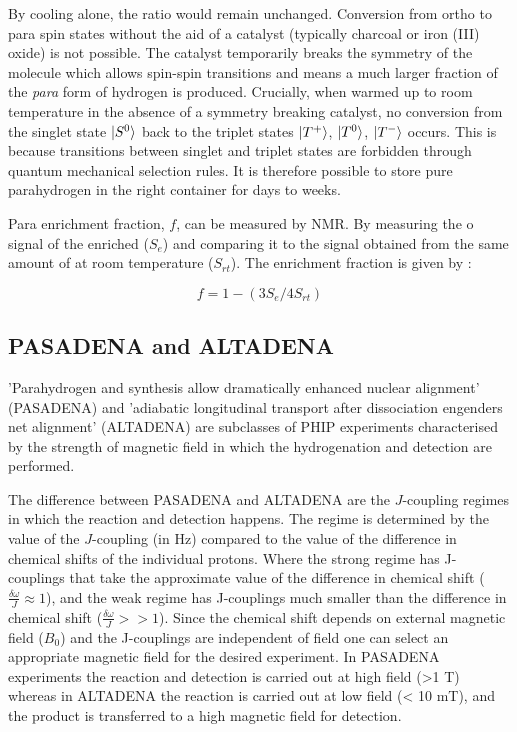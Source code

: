  By cooling alone, the ratio would remain unchanged. Conversion
 from ortho to para spin states without the aid of a catalyst (typically charcoal or iron (III) oxide) is not possible.
 The catalyst temporarily breaks the symmetry of the  molecule which allows spin-spin transitions and means
 a much larger fraction of the \textit{para} form of hydrogen is produced. Crucially, when warmed up to
 room temperature in the absence of a symmetry breaking catalyst, no conversion from the singlet state $\ket{S^0}$ back to
 the triplet states $\ket{T^+}$, $\ket{T^0}$, $\ket{T^-}$ occurs. This is because transitions between singlet and triplet states
 are forbidden through quantum mechanical selection rules. It is therefore possible to store pure parahydrogen
 in the right container for days to weeks.

 Para enrichment fraction, $f$, can be measured by NMR. By measuring the o signal of the enriched  ($S_{e}$)
 and comparing it to the signal obtained from the same amount of  at room temperature ($S_{rt}$).
 The enrichment fraction is given by \citep{RN131, RN132}:

 \begin{equation}\label{pfrac}
   f = 1 -(3S_{e}/4S_{rt})
 \end{equation}

 \subsection{PASADENA and ALTADENA}\label{PASADENA and ALTADENA}

 'Parahydrogen and synthesis allow dramatically enhanced nuclear alignment' (PASADENA)\citep{RN129} and 'adiabatic longitudinal
 transport after dissociation engenders net alignment' (ALTADENA)\citep{RN128}
 are subclasses of PHIP experiments characterised by the strength of magnetic
 field in which the hydrogenation and detection are performed.

 The difference between PASADENA and ALTADENA are the $J$-coupling regimes in which the reaction and detection happens.
 The regime is determined by the value of the $J$-coupling (in Hz) compared to the value of the difference in chemical
 shifts of the individual protons. Where the strong regime has J-couplings that take the approximate value of the difference in chemical shift
 ($\frac{\delta{\omega}}{J}\approx1$), and the weak regime has J-couplings much smaller than the difference in chemical
 shift ($\frac{\delta{\omega}}{J}>>1$). Since the chemical shift depends on external magnetic field ($B_{0}$) and the
 J-couplings are independent of field one can select an appropriate magnetic field for the desired experiment.
 In PASADENA experiments the reaction and detection is carried out at high field (>1 T) whereas in
 ALTADENA the reaction is carried out at low field (< 10 mT), and the product is transferred to a high magnetic field for detection\citep{RN130}.

